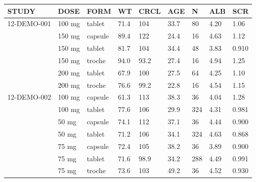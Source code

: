 {\def\arraystretch{1.4}\tabcolsep=5pt
\begin{threeparttable}
\begin{tabular}[h]{lllllllll}
\hline
STUDY & DOSE & FORM & WT & CRCL & AGE & N & ALB & SCR \\
\hline
12-DEMO-001 & 100 mg & tablet & 71.4 & 104 & 33.7 & 80 & 4.20 & 1.06 \\
 & 150 mg & capsule & 89.4 & 122 & 24.4 & 16 & 4.63 & 1.12 \\
 & 150 mg & tablet & 81.7 & 104 & 34.4 & 48 & 3.83 & 0.910 \\
 & 150 mg & troche & 94.0 & 93.2 & 27.4 & 16 & 4.94 & 1.25 \\
 & 200 mg & tablet & 67.9 & 100 & 27.5 & 64 & 4.25 & 1.10 \\
 & 200 mg & troche & 76.6 & 99.2 & 22.8 & 16 & 4.54 & 1.15 \\ \hline
12-DEMO-002 & 100 mg & capsule & 61.3 & 113 & 38.3 & 36 & 4.04 & 1.28 \\
 & 100 mg & tablet & 77.6 & 106 & 29.9 & 324 & 4.31 & 0.981 \\
 & 50 mg & capsule & 74.1 & 112 & 37.1 & 36 & 4.44 & 0.900 \\
 & 50 mg & tablet & 71.2 & 106 & 34.1 & 324 & 4.63 & 0.868 \\
 & 75 mg & capsule & 72.4 & 105 & 38.2 & 36 & 3.89 & 0.900 \\
 & 75 mg & tablet & 71.6 & 98.9 & 34.2 & 288 & 4.49 & 0.991 \\
 & 75 mg & troche & 73.6 & 103 & 49.2 & 36 & 4.52 & 0.930 \\
\hline
\end{tabular}
\end{threeparttable}
}
